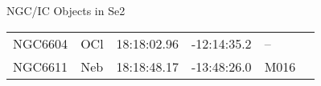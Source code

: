 \begin{block}{NGC/IC Objects in Se2}
  \centering
  \begin{tabularx}{\textwidth}{llrrll} 
    NGC6604 & OCl & 18:18:02.96 & -12:14:35.2  & -- \\ 
    NGC6611 & Neb & 18:18:48.17 & -13:48:26.0  & M016 \\ 
  \end{tabularx}
\end{block}
